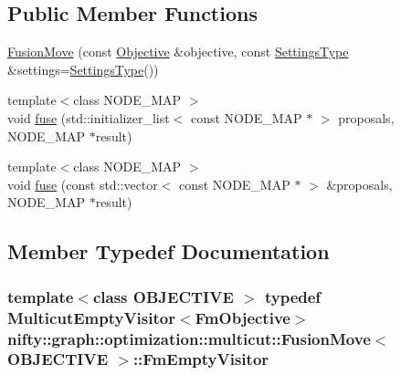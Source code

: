 \subsection*{Public Member Functions}
\begin{DoxyCompactItemize}
\item 
\hyperlink{classnifty_1_1graph_1_1optimization_1_1multicut_1_1FusionMove_a9b8fc092f503aebd3c9e983b596bce20}{Fusion\+Move} (const \hyperlink{classnifty_1_1graph_1_1optimization_1_1multicut_1_1FusionMove_a937dd91e6a61b9b906c97bc1089e2540}{Objective} \&objective, const \hyperlink{structnifty_1_1graph_1_1optimization_1_1multicut_1_1FusionMove_1_1SettingsType}{Settings\+Type} \&settings=\hyperlink{structnifty_1_1graph_1_1optimization_1_1multicut_1_1FusionMove_1_1SettingsType}{Settings\+Type}())
\item 
{\footnotesize template$<$class N\+O\+D\+E\+\_\+\+M\+A\+P $>$ }\\void \hyperlink{classnifty_1_1graph_1_1optimization_1_1multicut_1_1FusionMove_a1222f3416c80a6bbdade333d501e3e46}{fuse} (std\+::initializer\+\_\+list$<$ const N\+O\+D\+E\+\_\+\+M\+A\+P $\ast$ $>$ proposals, N\+O\+D\+E\+\_\+\+M\+A\+P $\ast$result)
\item 
{\footnotesize template$<$class N\+O\+D\+E\+\_\+\+M\+A\+P $>$ }\\void \hyperlink{classnifty_1_1graph_1_1optimization_1_1multicut_1_1FusionMove_a5c8f6ee3c46bb29a57de4d9a2f583945}{fuse} (const std\+::vector$<$ const N\+O\+D\+E\+\_\+\+M\+A\+P $\ast$ $>$ \&proposals, N\+O\+D\+E\+\_\+\+M\+A\+P $\ast$result)
\end{DoxyCompactItemize}


\subsection{Member Typedef Documentation}
\hypertarget{classnifty_1_1graph_1_1optimization_1_1multicut_1_1FusionMove_a46c112fcbbf408fde2488c59727b5dd6}{}
\subsubsection[{Fm\+Empty\+Visitor}]{\setlength{\rightskip}{0pt plus 5cm}template$<$class O\+B\+J\+E\+C\+T\+I\+V\+E $>$ typedef {\bf Multicut\+Empty\+Visitor}$<${\bf Fm\+Objective}$>$ {\bf nifty\+::graph\+::optimization\+::multicut\+::\+Fusion\+Move}$<$ O\+B\+J\+E\+C\+T\+I\+V\+E $>$\+::{\bf Fm\+Empty\+Visitor}}\label{classnifty_1_1graph_1_1optimization_1_1multicut_1_1FusionMove_a46c112fcbbf408fde2488c59727b5dd6}
\hypertarget{classnifty_1_1graph_1_1optimization_1_1multicut_1_1FusionMove_a2bf067e2ddf02a5d392ec4249c47f3f6}{}
